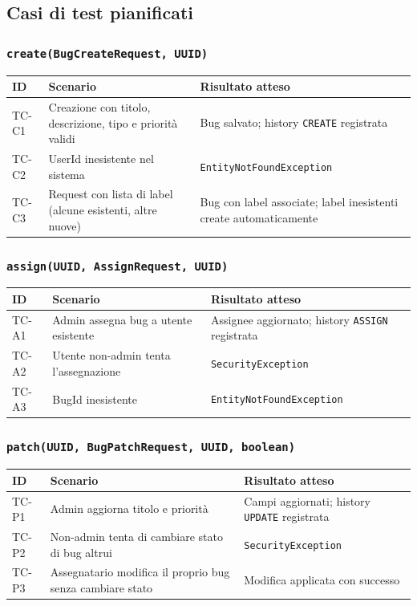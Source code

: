 ﻿\documentclass[a4paper,11pt]{article}
\begin{document}
\subsection{Casi di test pianificati}

\subsubsection{\texttt{create(BugCreateRequest, UUID)}}

\begin{tabular}{|l|p{6.5cm}|p{6cm}|}
\hline
\textbf{ID} & \textbf{Scenario} & \textbf{Risultato atteso} \\
\hline
TC-C1 & Creazione con titolo, descrizione, tipo e priorit\`a validi & Bug salvato; history \texttt{CREATE} registrata \\
\hline
TC-C2 & UserId inesistente nel sistema & \texttt{EntityNotFoundException} \\
\hline
TC-C3 & Request con lista di label (alcune esistenti, altre nuove) & Bug con label associate; label inesistenti create automaticamente \\
\hline
\end{tabular}

\subsubsection{\texttt{assign(UUID, AssignRequest, UUID)}}

\begin{tabular}{|l|p{6.5cm}|p{6cm}|}
\hline
\textbf{ID} & \textbf{Scenario} & \textbf{Risultato atteso} \\
\hline
TC-A1 & Admin assegna bug a utente esistente & Assignee aggiornato; history \texttt{ASSIGN} registrata \\
\hline
TC-A2 & Utente non-admin tenta l'assegnazione & \texttt{SecurityException} \\
\hline
TC-A3 & BugId inesistente & \texttt{EntityNotFoundException} \\
\hline
\end{tabular}

\subsubsection{\texttt{patch(UUID, BugPatchRequest, UUID, boolean)}}

\begin{tabular}{|l|p{6.5cm}|p{6cm}|}
\hline
\textbf{ID} & \textbf{Scenario} & \textbf{Risultato atteso} \\
\hline
TC-P1 & Admin aggiorna titolo e priorit\`a & Campi aggiornati; history \texttt{UPDATE} registrata \\
\hline
TC-P2 & Non-admin tenta di cambiare stato di bug altrui & \texttt{SecurityException} \\
\hline
TC-P3 & Assegnatario modifica il proprio bug senza cambiare stato & Modifica applicata con successo \\
\hline
\end{tabular}
\end{document}
